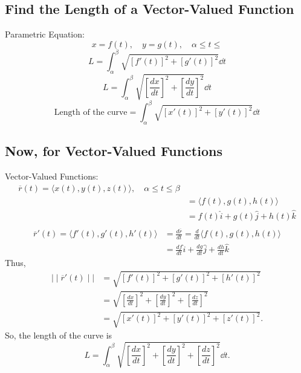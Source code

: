 \documentclass{article}
\begin{document}
\subsection*{Find the Length of a Vector-Valued Function}

\begin{definitionbox}
Parametric Equation:
\[
    x = f(t), \quad y = g(t), \quad \alpha \leq t \leq 
\]
\[
    L = \int_{\alpha}^{\beta} \sqrt{[f'(t)]^2 + [g'(t)]^2} \dd{t}
\]
\[
    L = \int_{\alpha}^{\beta} \sqrt{\left[\frac{dx}{dt}\right]^2 + \left[\frac{dy}{dt}\right]^2} \dd{t}
\]
\[
    \text{Length of the curve} = \int_{\alpha}^{\beta} \sqrt{[x'(t)]^2 + [y'(t)]^2} \dd{t}
\]
\end{definitionbox}

\subsection*{Now, for Vector-Valued Functions}
\begin{definitionbox}
Vector-Valued Functions:
\begin{align*}
    \overline{r}(t) = \langle x(t), y(t), z(t) \rangle, \quad \alpha \leq t \leq \beta \\
    &= \langle f(t), g(t), h(t) \rangle \\
    &= f(t) \hat{i} + g(t) \hat{j} + h(t) \hat{k} \\
\end{align*}
\begin{align*}
    \overline{r}'(t) = \langle f'(t), g'(t), h'(t) \rangle
    &= \frac{d\overline{r}}{dt} = \frac{d}{dt} \langle f(t), g(t), h(t) \rangle \\
    &= \frac{df}{dt} \hat{i} + \frac{dg}{dt} \hat{j} + \frac{dh}{dt} \hat{k}
\end{align*}
Thus,
\begin{align*}
    \mid \mid \overline{r}'(t) \mid \mid &= \sqrt{[f'(t)]^2 + [g'(t)]^2 + [h'(t)]^2} \\
    &= \sqrt{\left[\frac{dx}{dt}\right]^2 + \left[\frac{dy}{dt}\right]^2 + \left[\frac{dz}{dt}\right]^2} \\
    &= \sqrt{[x'(t)]^2 + [y'(t)]^2 + [z'(t)]^2}.
\end{align*}
So, the length of the curve is
\[
    L = \int_{\alpha}^{\beta} \sqrt{\left[\frac{dx}{dt}\right]^2 + \left[\frac{dy}{dt}\right]^2 + \left[\frac{dz}{dt}\right]^2} \dd{t}.
\]
\end{definitionbox}
\end{document}
